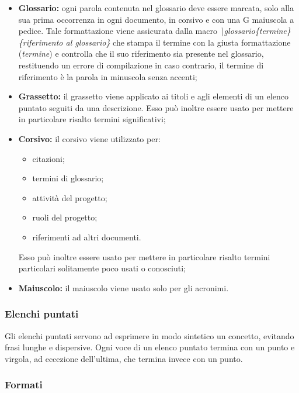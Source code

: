 \documentclass[../NormediProgetto.tex]{subfiles}
\begin{document}
\begin{itemize}
	
	\item \textbf{Glossario:} ogni parola contenuta nel glossario deve essere marcata, solo alla sua prima occorrenza in ogni documento, in corsivo e con una G maiuscola a pedice. Tale formattazione viene assicurata dalla macro \textit{\textbackslash glossario\{termine\}\{riferimento al glossario\}} che stampa il termine con la giusta formattazione (\textit{termine}) e controlla che il suo riferimento sia presente nel glossario, restituendo un errore di compilazione in caso contrario, il termine di riferimento è la parola in minuscola senza accenti;  
	
	\item \textbf{Grassetto:} il grassetto viene applicato ai titoli e agli elementi di un elenco puntato seguiti da una descrizione. Esso può inoltre essere usato per mettere in particolare risalto termini significativi; 
	
	\item \textbf{Corsivo:} il corsivo viene utilizzato per:
	\begin{itemize}
		\item citazioni;
		\item termini di glossario;
		\item attività del progetto;
		\item ruoli del progetto;
		\item riferimenti ad altri documenti.
	\end{itemize}
	
	Esso può inoltre essere usato per mettere in particolare risalto termini particolari solitamente poco usati o conosciuti;
	
	\item{\textbf{Maiuscolo:}} il maiuscolo viene usato solo per gli acronimi.
	
\end{itemize}

\subsubsection{Elenchi puntati}

Gli elenchi puntati servono ad esprimere in modo sintetico un concetto, evitando frasi lunghe e dispersive. Ogni voce di un elenco puntato termina con un punto e virgola, ad eccezione dell'ultima, che termina invece con un punto.

\subsubsection{Formati}
\end{document}
